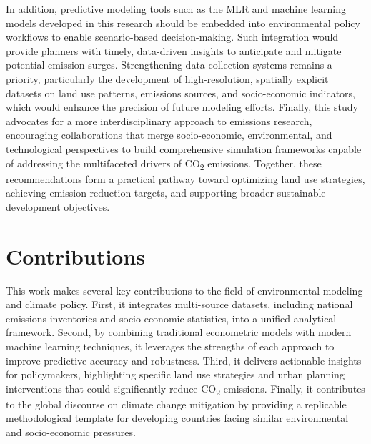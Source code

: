 \documentclass[10pt,letterpaper]{article}
\begin{document}
In addition, predictive modeling tools such as the MLR and machine learning models developed in this research should be embedded into environmental policy workflows to enable scenario-based decision-making. Such integration would provide planners with timely, data-driven insights to anticipate and mitigate potential emission surges. Strengthening data collection systems remains a priority, particularly the development of high-resolution, spatially explicit datasets on land use patterns, emissions sources, and socio-economic indicators, which would enhance the precision of future modeling efforts. Finally, this study advocates for a more interdisciplinary approach to emissions research, encouraging collaborations that merge socio-economic, environmental, and technological perspectives to build comprehensive simulation frameworks capable of addressing the multifaceted drivers of CO\textsubscript{2} emissions. Together, these recommendations form a practical pathway toward optimizing land use strategies, achieving emission reduction targets, and supporting broader sustainable development objectives.

\section*{Contributions}
\label{sec:contributions}

This work makes several key contributions to the field of environmental modeling and climate policy. First, it integrates multi-source datasets, including national emissions inventories and socio-economic statistics, into a unified analytical framework. Second, by combining traditional econometric models with modern machine learning techniques, it leverages the strengths of each approach to improve predictive accuracy and robustness. Third, it delivers actionable insights for policymakers, highlighting specific land use strategies and urban planning interventions that could significantly reduce CO\textsubscript{2} emissions. Finally, it contributes to the global discourse on climate change mitigation by providing a replicable methodological template for developing countries facing similar environmental and socio-economic pressures.
\end{document}
